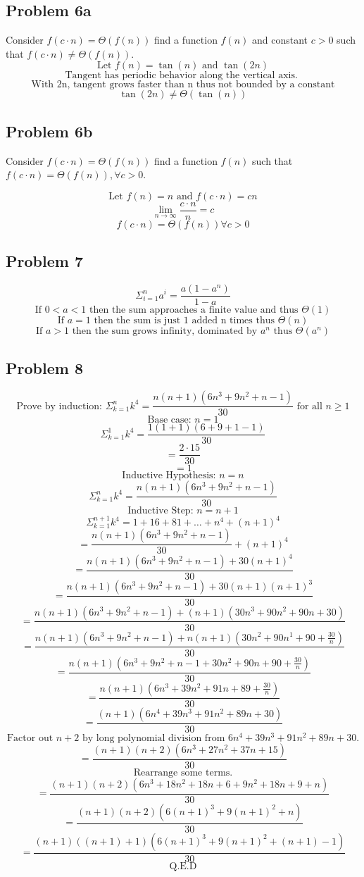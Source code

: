 \documentclass{article}
\begin{document}
\subsection{Problem 6a}
Consider $f(c\cdot n) = \Theta(f(n))$ find a function $f(n)$ and constant $c > 0$ such that $f(c \cdot n) \neq \Theta(f(n))$.
$$\text{Let } f(n) = \tan(n) \text{ and } \tan(2n)$$
$$\text{Tangent has periodic behavior along the vertical axis. }$$
$$\text{With 2n, tangent grows faster than n thus not bounded by a constant}$$
$$\tan(2n) \neq \Theta(\tan(n))$$

\subsection{Problem 6b}
Consider $f(c\cdot n) = \Theta(f(n))$ find a function $f(n)$ such that $f(c \cdot n) = \Theta(f(n)), \forall c > 0$.

$$\text{Let } f(n) = n \text{ and } f(c \cdot n) = cn$$
$$\lim_{n \rightarrow \infty} \frac{c \cdot n}{n} = c$$
$$f(c \cdot n) = \Theta(f(n)) \forall c > 0$$

\subsection{Problem 7}

$$\Sigma_{i=1}^{n} a^i = \frac{a(1-a^n)}{1-a}$$
$$\text{If } 0 < a < 1 \text{ then the sum approaches a finite value and thus } \Theta(1)$$
$$\text{If } a = 1 \text{ then the sum is just 1 added n times thus } \Theta(n)$$
$$\text{If } a > 1 \text{ then the sum grows infinity, dominated by } a^n \text{ thus } \Theta(a^n)$$

\subsection{Problem 8}

$$\text{Prove by induction: } \Sigma_{k=1}^{n} k^4 = \frac{n(n+1)(6n^3 + 9n^2 + n - 1)}{30} \text{ for all } n \ge 1$$
$$\text{Base case: } n = 1 $$
$$\Sigma_{k=1}^{1} k^4 = \frac{1(1+1)(6+9+1-1)}{30}$$
$$= \frac{2\cdot15}{30}$$
$$= 1 $$
$$\text{Inductive Hypothesis: } n = n$$
$$\Sigma_{k=1}^{n} k^4 = \frac{n(n+1)(6n^3 + 9n^2 + n - 1)}{30}$$
$$\text{Inductive Step: } n = n+1$$
$$\Sigma_{k=1}^{n+1} k^4 = 1 + 16 + 81 + \dots + n^4 + (n+1)^4$$
$$= \frac{n(n+1)(6n^3 + 9n^2 + n - 1)}{30} + (n+1)^4$$
$$= \frac{n(n+1)(6n^3 + 9n^2 + n - 1) + 30(n+1)^4}{30} $$
$$= \frac{n(n+1)(6n^3 + 9n^2 + n - 1) + 30(n+1)(n+1)^3}{30} $$
$$= \frac{n(n+1)(6n^3 + 9n^2 + n - 1) + (n+1)(30n^3 + 90n^2 + 90n +30)}{30} $$
$$= \frac{n(n+1)(6n^3 + 9n^2 + n - 1) + n(n+1)(30n^2 + 90n^1 + 90 + \frac{30}{n})}{30} $$
$$= \frac{n(n+1)(6n^3 + 9n^2 + n - 1 + 30n^2 + 90n + 90 + \frac{30}{n})}{30} $$
$$= \frac{n(n+1)(6n^3 + 39n^2 + 91n + 89 + \frac{30}{n})}{30} $$
$$= \frac{(n+1)(6n^4 + 39n^3 + 91n^2 + 89n + 30)}{30} $$
$$\text{Factor out } n + 2 \text{ by long polynomial division from } 6n^4 + 39n^3 + 91n^2 + 89n + 30 \text{.}$$
$$= \frac{(n+1)(n+2)(6n^3 + 27n^2 + 37n + 15)}{30} $$
$$\text{Rearrange some terms.}$$
$$= \frac{(n+1)(n+2)(6n^3 + 18n^2 + 18n + 6 + 9n^2 + 18n + 9 + n)}{30} $$
$$= \frac{(n+1)(n+2)(6(n+1)^3 + 9(n+1)^2 + n)}{30} $$
$$= \frac{(n+1)((n + 1) + 1)(6(n+1)^3 + 9(n+1)^2 + (n + 1) - 1)}{30} $$
$$\text{Q.E.D}$$
\end{document}
